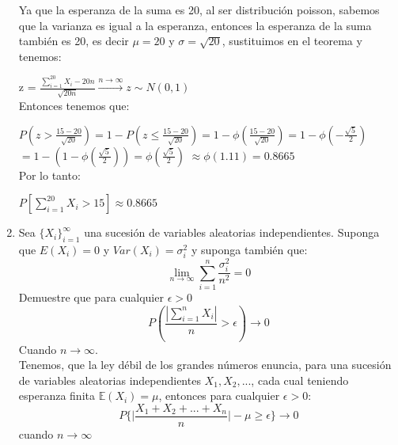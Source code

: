 \documentclass[11pt,a4paper]{report}
\begin{document}
\begin{enumerate}
{\begin{enumerate}
				Ya que la esperanza de la suma es 20, al ser distribución poisson, sabemos que la varianza es igual a la esperanza, entonces la esperanza de la suma también es 20, es decir $\mu = 20$ y $\sigma = \sqrt{20}$, sustituimos en el teorema y tenemos:
				
				z = $\frac{\sum_{i=1}^{20} X_{i} - 20n }{\sqrt{20n}}  \xrightarrow{n \to \infty}  z \sim N(0,1)$\\
				
				Entonces tenemos que:
				
				$P(z > \frac{15 - 20}{\sqrt{20}}) = 1 - P(z \leq \frac{15 - 20}{\sqrt{20}}) = 1 - \phi (\frac{15 - 20}{\sqrt{20}}) = 1 - \phi(-\frac{\sqrt{5}}{2})$
				$= 1 - (1 - \phi (\frac{\sqrt{5}}{2})) = \phi(\frac{\sqrt{5}}{2})$
				$\approx \phi(1.11) = 0.8665$\\
				
				Por lo tanto:
				
				$P[\sum_{i=1}^{20}X_{i}>15] \approx 0.8665$\\
			\end{enumerate}
		}

		\item{
	    Sea $\lbrace X_{i} \rbrace _{i=1}^{\infty}$ una sucesión de variables aleatorias independientes. Suponga que $E(X_{i})=0$ y $Var(X_{i})=\sigma_{i}^{2}$ y suponga también que:
	            $$\lim_{n \rightarrow \infty}\sum_{i=1}^{n}\frac{\sigma_{i}^{2}}{n^2}=0$$
	   Demuestre que para cualquier $\epsilon >0$
	                $$P(\frac{|\sum_{i=1}^{n}X_{i}|}{n}>\epsilon)\rightarrow 0$$
	   Cuando $n\rightarrow \infty$.\\

	   Tenemos, que la ley débil de los grandes números enuncia, para una 
	   sucesión de variables aleatorias independientes $X_1, X_2, ...$, cada 
	   cual teniendo esperanza finita $\mathbb{E}(X_i) = \mu$, entonces para 
	   cualquier $\epsilon > 0$:
			$$ P\Big\{ \Big| \frac{X_1 + X_2 + ... + X_n}{n} \Big| - \mu \geq 
				\epsilon \Big\} \rightarrow 0$$
		cuando $n \rightarrow \infty$

}
\end{enumerate}
\end{document}
